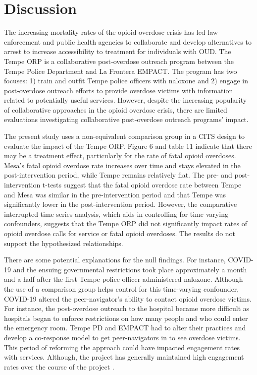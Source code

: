 \section{\centering Discussion}
The increasing mortality rates of the opioid overdose crisis has led law enforcement and public health agencies to collaborate and develop alternatives to arrest to increase accessibility to treatment for individuals with OUD. The Tempe ORP is a collaborative post-overdose outreach program between the Tempe Police Department and La Frontera EMPACT. The program has two focuses: 1) train and outfit Tempe police officers with naloxone and 2) engage in post-overdose outreach efforts to provide overdose victims with information related to potentially useful services. However, despite the increasing popularity of collaborative approaches in the opioid overdose crisis, there are limited evaluations investigating collaborative post-overdose outreach programs' impact.

The present study uses a non-equivalent comparison group in a CITS design to evaluate the impact of the Tempe ORP. Figure 6 and table 11 indicate that there may be a treatment effect, particularly for the rate of fatal opioid overdoses. Mesa's fatal opioid overdose rate increases over time and stays elevated in the post-intervention period, while Tempe remains relatively flat. The pre- and post-intervention t-tests suggest that the fatal opioid overdose rate between Tempe and Mesa was similar in the pre-intervention period and that Tempe was significantly lower in the post-intervention period. However, the comparative interrupted time series analysis, which aids in controlling for time varying confounders, suggests that the Tempe ORP did not significantly impact rates of opioid overdose calls for service or fatal opioid overdoses. The results do not support the hypothesized relationships. 

There are some potential explanations for the null findings. For instance, COVID-19 and the ensuing governmental restrictions took place approximately a month and a half after the first Tempe police officer administered naloxone. Although the use of a comparison group helps control for this time-varying confounder, COVID-19 altered the peer-navigator's ability to contact opioid overdose victims. For instance, the post-overdose outreach to the hospital became more difficult as hospitals began to enforce restrictions on how many people and who could enter the emergency room. Tempe PD and EMPACT had to alter their practices and develop a co-response model to get peer-navigators in to see overdose victims. This period of reforming the approach could have impacted engagement rates with services. Although, the project has generally maintained high engagement rates over the course of the project \parencite{watts_tempe_2023}.

